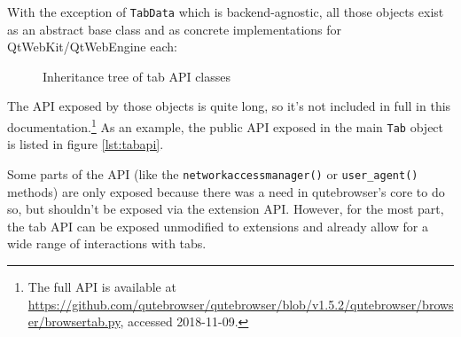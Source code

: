 \documentclass[a4paper,parskip=full,DIV=14,BCOR=15mm]{scrreprt}
\begin{document}
With the exception of \verb|TabData| which is backend-agnostic, all those
objects exist as an abstract base class and as concrete implementations for
QtWebKit/QtWebEngine each:

\begin{figure}[h]
\begin{center}
\end{center}
\caption{Inheritance tree of tab API classes}
  \label{fig:tabapi-inherit}
\end{figure}

The API exposed by those objects is quite long, so it's not included in full in
this documentation.\footnote{The full API is available at
  \url{https://github.com/qutebrowser/qutebrowser/blob/v1.5.2/qutebrowser/browser/browsertab.py},
accessed 2018-11-09.} As an example, the public API exposed in the main
\verb|Tab| object is listed in figure \ref{lst:tabapi}.

Some parts of the API (like the \verb|networkaccessmanager()| or
\verb|user_agent()| methods) are only exposed because there was a need in
qutebrowser's core to do so, but shouldn't be exposed via the extension API.
However, for the most part, the tab API can be exposed unmodified to extensions
and already allow for a wide range of interactions with tabs.
\end{document}
